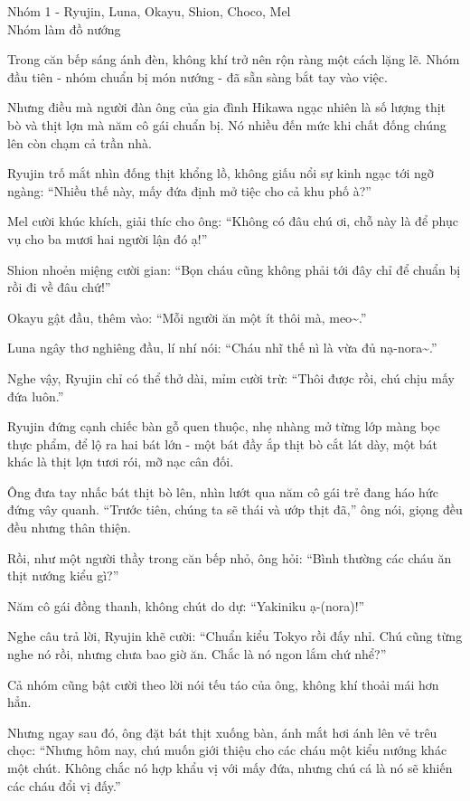 \documentclass[../main.tex]{subfiles}
\begin{document}
\begin{center}
    {\color{T1} Nhóm 1 - Ryujin, Luna, Okayu, Shion, Choco, Mel\\Nhóm làm đồ nướng}
\end{center}

Trong căn bếp sáng ánh đèn, không khí trở nên rộn ràng một cách lặng lẽ. Nhóm đầu tiên - nhóm chuẩn bị món nướng - đã sẵn sàng bắt tay vào việc.

Nhưng điều mà người đàn ông của gia đình Hikawa ngạc nhiên là số lượng thịt bò và thịt lợn mà năm cô gái chuẩn bị. Nó nhiều đến mức khi chất đống chúng lên còn chạm cả trần nhà.

Ryujin trố mắt nhìn đống thịt khổng lồ, không giấu nổi sự kinh ngạc tới ngỡ ngàng: ``Nhiều thế này, mấy đứa định mở tiệc cho cả khu phố à?''

Mel cười khúc khích, giải thíc cho ông: ``Không có đâu chú ơi, chỗ này là để phục vụ cho ba mươi hai người lận đó ạ!''

Shion nhoẻn miệng cười gian: ``Bọn cháu cũng không phải tới đây chỉ để chuẩn bị rồi đi về đâu chứ!''

Okayu gật đầu, thêm vào: ``Mỗi người ăn một ít thôi mà, meo\~{}.''

Luna ngây thơ nghiêng đầu, lí nhí nói: ``Cháu nhĩ thế nì là vừa đủ nạ-nora\~{}.''

Nghe vậy, Ryujin chỉ có thể thở dài, mỉm cười trừ: ``Thôi được rồi, chú chịu mấy đứa luôn.''

Ryujin đứng cạnh chiếc bàn gỗ quen thuộc, nhẹ nhàng mở từng lớp màng bọc thực phẩm, để lộ ra hai bát lớn - một bát đầy ắp thịt bò cắt lát dày, một bát khác là thịt lợn tươi rói, mỡ nạc cân đối.

Ông đưa tay nhấc bát thịt bò lên, nhìn lướt qua năm cô gái trẻ đang háo hức đứng vây quanh. ``Trước tiên, chúng ta sẽ thái và ướp thịt đã,'' ông nói, giọng đều đều nhưng thân thiện.

Rồi, như một người thầy trong căn bếp nhỏ, ông hỏi: ``Bình thường các cháu ăn thịt nướng kiểu gì?''

Năm cô gái đồng thanh, không chút do dự: ``Yakiniku ạ-(nora)!''

Nghe câu trả lời, Ryujin khẽ cười: ``Chuẩn kiểu Tokyo rồi đấy nhỉ. Chú cũng từng nghe nó rồi, nhưng chưa bao giờ ăn. Chắc là nó ngon lắm chứ nhể?''

Cả nhóm cũng bật cười theo lời nói tếu táo của ông, không khí thoải mái hơn hẳn.

Nhưng ngay sau đó, ông đặt bát thịt xuống bàn, ánh mắt hơi ánh lên vẻ trêu chọc: ``Nhưng hôm nay, chú muốn giới thiệu cho các cháu một kiểu nướng khác một chút. Không chắc nó hợp khẩu vị với mấy đứa, nhưng chú cá là nó sẽ khiến các cháu đổi vị đấy.''
\end{document}
